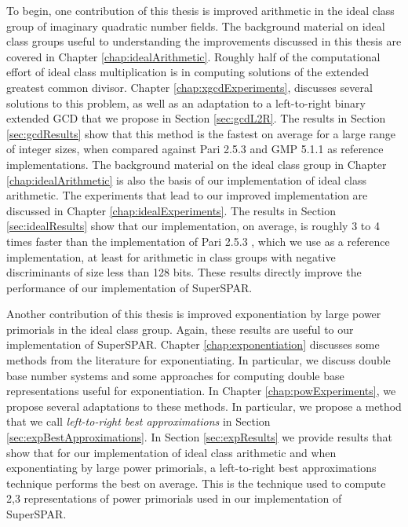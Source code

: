 \documentclass{ucalgthes1}
\theoremstyle{definition}
\newcommand{\GMP}{GMP 5.1.1}
\newcommand{\Pari}{Pari 2.5.3}
\begin{document}
To begin, one contribution of this thesis is improved arithmetic in the ideal class group of imaginary quadratic number fields.  The background material on ideal class groups useful to understanding the improvements discussed in this thesis are covered in Chapter \ref{chap:idealArithmetic}.  Roughly half of the computational effort of ideal class multiplication is in computing solutions of the extended greatest common divisor.  Chapter \ref{chap:xgcdExperiments}, discusses several solutions to this problem, as well as an adaptation to a left-to-right binary extended GCD that we propose in Section \ref{sec:gcdL2R}.  The results in Section \ref{sec:gcdResults} show that this method is the fastest on average for a large range of integer sizes, when compared against \Pari{} \cite{PariGP} and \GMP{} \cite{Gmp} as reference implementations.  The background material on the ideal class group in Chapter \ref{chap:idealArithmetic} is also the basis of our implementation of ideal class arithmetic.  The experiments that lead to our improved implementation are discussed in Chapter \ref{chap:idealExperiments}.  The results in Section \ref{sec:idealResults} show that our implementation, on average, is roughly 3 to 4 times faster than the implementation of \Pari{} \cite{PariGP}, which we use as a reference implementation, at least for arithmetic in class groups with negative discriminants of size less than 128 bits.  These results directly improve the performance of our implementation of SuperSPAR.

Another contribution of this thesis is improved exponentiation by large power primorials in the ideal class group.  Again, these results are useful to our implementation of SuperSPAR.  Chapter \ref{chap:exponentiation} discusses some methods from the literature for exponentiating.  In particular, we discuss double base number systems and some approaches for computing double base representations useful for exponentiation.  In Chapter \ref{chap:powExperiments}, we propose several adaptations to these methods.  In particular, we propose a method that we call \emph{left-to-right best approximations} in Section \ref{sec:expBestApproximations}.  In Section \ref{sec:expResults} we provide results that show that for our implementation of ideal class arithmetic and when exponentiating by large power primorials, a left-to-right best approximations technique performs the best on average.  This is the technique used to compute 2,3 representations of power primorials used in our implementation of SuperSPAR.
\end{document}

